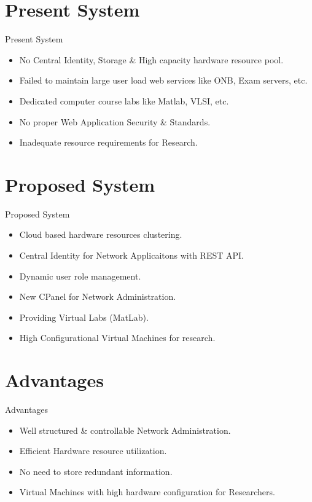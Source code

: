 \documentclass[xcolor=dvipsnames]{beamer}
\begin{document}
\section{Present System}
\begin{frame}{Present System}

\begin{itemize}
	\item No Central Identity, Storage \& High capacity hardware resource pool.
	\item Failed to maintain large user load web services like ONB, Exam servers, etc.
	\item Dedicated computer course labs like Matlab, VLSI, etc.
	\item No proper Web Application Security \& Standards.
	\item Inadequate resource requirements for Research.
\end{itemize}

\end{frame}



\section{Proposed System}
\begin{frame}{Proposed System}
\begin{itemize}
	\item Cloud based hardware resources clustering.
	\item Central Identity for Network Applicaitons with REST API.
	\item Dynamic user role management.
	\item New CPanel for Network Administration.
	\item Providing Virtual Labs (MatLab).
	\item High Configurational Virtual Machines for research.
\end{itemize}
\end{frame}

\section{Advantages}
\begin{frame}{Advantages}
\begin{itemize}
	\item Well structured \& controllable Network Administration.
	\item Efficient Hardware resource utilization.
	\item No need to store redundant information.
	\item Virtual Machines with high hardware configuration for Researchers.
\end{itemize}
\end{frame}
\end{document}
